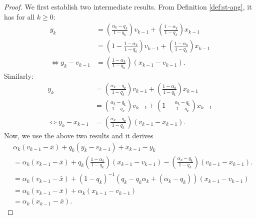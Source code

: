 \documentclass[12pt]{article}
\begin{document}
        \begin{proof}
            We first establish two intermediate results. 
            From Definition \ref{def:st-apg}, it has for all $k \ge 0$: 
            \begin{align*}
                y_k &= 
                \left(\frac{\alpha_k - q_k}{1 - q_k}\right)v_{k - 1} 
                + \left(\frac{1 - \alpha_k}{1 - q_k}\right) x_{k - 1}
                \\
                &= 
                \left(
                    1 - \frac{1 - \alpha_k}{1 - q_k}
                \right)v_{k - 1} 
                + \left(\frac{1 - \alpha_k}{1 - q_k}\right) x_{k - 1}
                \\
                \iff 
                y_k - v_{k - 1}
                &= \left(
                    \frac{1 - \alpha_k}{1 - q_k}
                \right)(x_{k - 1} - v_{k - 1}). 
            \end{align*}
            Similarly: 
            \begin{align*}
                y_k &= 
                \left(\frac{\alpha_k - q_k}{1 - q_k}\right)v_{k - 1} 
                + \left(\frac{1 - \alpha_k}{1 - q_k}\right) x_{k - 1}
                \\
                &= 
                \left(\frac{\alpha_k - q_k}{1 - q_k}\right)v_{k - 1} 
                + \left(1 - \frac{\alpha_k - q_k}{1 - q_k}\right) x_{k - 1}
                \\
                \iff 
                y_k - x_{k - 1} &= 
                \left(
                    \frac{\alpha_k - q_k}{1 - q_k}
                \right)(v_{k - 1} - x_{k - 1}). 
            \end{align*}
            Now, we use the above two results and it derives 
            \begin{align*}
                & \alpha_k(v_{k - 1} - \bar x) 
                + q_k(y_k - v_{k - 1})
                + x_{k - 1} - y_k
                \\
                &=
                \alpha_k(v_{k - 1} - \bar x)
                + q_k\left(
                    \frac{1 - \alpha_k}{1 - q_k}
                \right)(x_{k - 1} - v_{k - 1})
                - \left(
                    \frac{\alpha_k - q_k}{1 - q_k}    
                \right)(v_{k - 1} - x_{k - 1}). 
                \\
                &= 
                \alpha_k(v_{k - 1} - \bar x)
                + (1 - q_k)^{-1}\left(
                    q_k - q_k\alpha_k +(\alpha_k - q_k)
                \right)
                (x_{k - 1} - v_{k - 1})
                \\
                &= 
                \alpha_k(v_{k - 1} - \bar x)
                + \alpha_k(x_{k - 1} - v_{k - 1})
                \\
                &= \alpha_k(x_{k - 1} - \bar x). 
            \end{align*}

        \end{proof}
\end{document}

